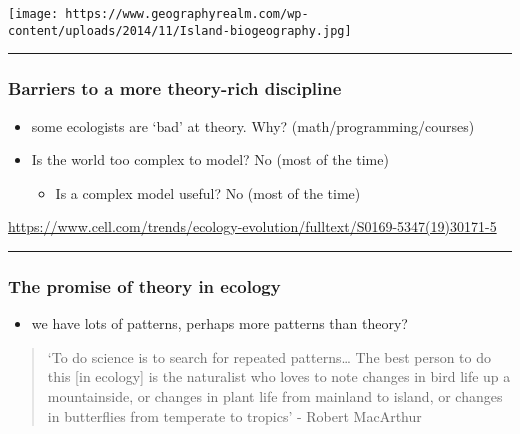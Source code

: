 \documentclass[
]{article}
\providecommand{\tightlist}{%
  \setlength{\itemsep}{0pt}\setlength{\parskip}{0pt}}
\begin{document}
\texttt{[image: https://www.geographyrealm.com/wp-content/uploads/2014/11/Island-biogeography.jpg]}

\begin{center}\rule{0.5\linewidth}{0.5pt}\end{center}

\hypertarget{barriers-to-a-more-theory-rich-discipline}{%
\subsubsection{Barriers to a more theory-rich
discipline}\label{barriers-to-a-more-theory-rich-discipline}}

\begin{itemize}
\tightlist
\item
  some ecologists are `bad' at theory. Why? (math/programming/courses)
\item
  Is the world too complex to model? No (most of the time)

  \begin{itemize}
  \tightlist
  \item
    Is a complex model useful? No (most of the time)
  \end{itemize}
\end{itemize}

\url{https://www.cell.com/trends/ecology-evolution/fulltext/S0169-5347(19)30171-5}

\begin{center}\rule{0.5\linewidth}{0.5pt}\end{center}

\hypertarget{the-promise-of-theory-in-ecology}{%
\subsubsection{The promise of theory in
ecology}\label{the-promise-of-theory-in-ecology}}

\begin{itemize}
\tightlist
\item
  we have lots of patterns, perhaps more patterns than theory?
\end{itemize}

\begin{quote}
`To do science is to search for repeated patterns\ldots{} The best
person to do this {[}in ecology{]} is the naturalist who loves to note
changes in bird life up a mountainside, or changes in plant life from
mainland to island, or changes in butterflies from temperate to tropics'
- Robert MacArthur
\end{quote}
\end{document}
